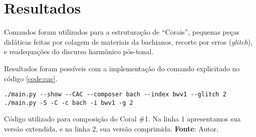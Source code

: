 \section{Resultados}\label{sec:resultados}

Comandos foram utilizados para a estruturação de ``Corais'', pequenas peças didáticas feitas por colagem de materiais da bachianos, recorte por erros (\emph{glitch}), e readequações do discurso harmônico pós-tonal. 

Resultados foram possíveis com a implementação do comando explicitado no código \ref{code:cac}.

\begin{listing}
\begin{verbatim}
./main.py --show --CAC --composer bach --index bwv1 --glitch 2
./main.py -S -C -c bach -i bwv1 -g 2
\end{verbatim}
\caption{Código utilizado para composição do Coral \#1. Na linha 1 apresentamos sua versão extendida, e na linha 2, sua versão comprimida. \textbf{Fonte}: Autor.}
\label{code:cac}
\end{listing}


